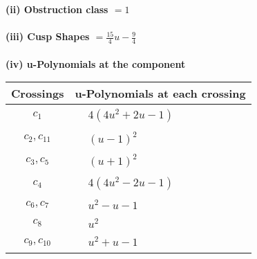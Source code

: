 \documentclass[1p]{elsarticle_modified}
\theoremstyle{definition}
\begin{document}
\flushleft \textbf{(ii) Obstruction class $= 1$}\\~\\
\flushleft \textbf{(iii) Cusp Shapes $= \frac{15}{4} u-\frac{9}{4}$}\\~\\
\newpage\renewcommand{\arraystretch}{1}
\flushleft \textbf{(iv) u-Polynomials at the component}\newline \\
\begin{tabular}{m{50pt}|m{274pt}}
Crossings & \hspace{64pt}u-Polynomials at each crossing \\
\hline $$\begin{aligned}c_{1}\end{aligned}$$&$\begin{aligned}
&4(4 u^2+2 u-1)
\end{aligned}$\\
\hline $$\begin{aligned}c_{2},c_{11}\end{aligned}$$&$\begin{aligned}
&(u-1)^2
\end{aligned}$\\
\hline $$\begin{aligned}c_{3},c_{5}\end{aligned}$$&$\begin{aligned}
&(u+1)^2
\end{aligned}$\\
\hline $$\begin{aligned}c_{4}\end{aligned}$$&$\begin{aligned}
&4(4 u^2-2 u-1)
\end{aligned}$\\
\hline $$\begin{aligned}c_{6},c_{7}\end{aligned}$$&$\begin{aligned}
&u^2- u-1
\end{aligned}$\\
\hline $$\begin{aligned}c_{8}\end{aligned}$$&$\begin{aligned}
&u^2
\end{aligned}$\\
\hline $$\begin{aligned}c_{9},c_{10}\end{aligned}$$&$\begin{aligned}
&u^2+u-1
\end{aligned}$\\
\hline
\end{tabular}\\~\\
\end{document}
